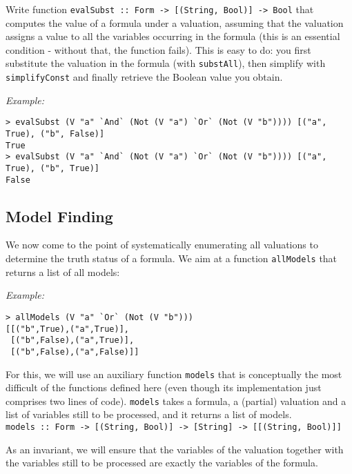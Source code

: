 \documentclass[english]{article}
\begin{document}
\begin{exo}\label{exo:evalSubst}
Write function \texttt{evalSubst :: Form -> [(String, Bool)] -> Bool} that
computes the value of a formula under a valuation, assuming that the valuation
assigns a value to all the variables occurring in the formula (this is an
essential condition - without that, the function fails). This is easy to
do: you first substitute the valuation in the formula (with
\texttt{substAll}), then simplify with \texttt{simplifyConst} and finally
retrieve the Boolean value you obtain.
\end{exo}

\noindent
\emph{Example:}
\begin{lstlisting}
> evalSubst (V "a" `And` (Not (V "a") `Or` (Not (V "b")))) [("a", True), ("b", False)]
True
> evalSubst (V "a" `And` (Not (V "a") `Or` (Not (V "b")))) [("a", True), ("b", True)]
False
\end{lstlisting}

\subsection{Model Finding}\label{sec:evaluating_models}

We now come to the point of systematically enumerating all valuations to
determine the truth status of a formula. We aim at a function \texttt{allModels}
that returns a list of all models:

\noindent
\emph{Example:}
\begin{lstlisting}
> allModels (V "a" `Or` (Not (V "b")))
[[("b",True),("a",True)],
 [("b",False),("a",True)],
 [("b",False),("a",False)]]
\end{lstlisting}

For this, we will use an auxiliary function \texttt{models} that is
conceptually the most difficult of the functions defined here (even though its
implementation just comprises two lines of code). \texttt{models} takes a
formula, a (partial) valuation and a list of variables still to be processed,
and it returns a list of models.\\
\texttt{models :: Form -> [(String, Bool)] -> [String] -> [[(String, Bool)]]}

As an invariant, we will ensure that the variables of the valuation together
with the variables still to be processed are exactly the variables of the
formula. 
\end{document}
